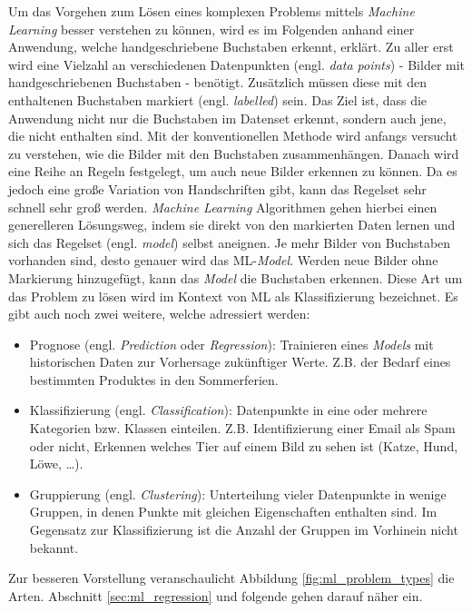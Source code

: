Um das Vorgehen zum Lösen eines komplexen Problems mittels \textit{Machine Learning} besser verstehen zu können, wird es im Folgenden anhand einer Anwendung, welche handgeschriebene Buchstaben erkennt, erklärt. Zu aller erst wird eine Vielzahl an verschiedenen Datenpunkten (engl. \textit{data points}) - Bilder mit handgeschriebenen Buchstaben - benötigt. Zusätzlich müssen diese mit den enthaltenen Buchstaben markiert (engl. \textit{labelled}) sein. Das Ziel ist, dass die Anwendung nicht nur die Buchstaben im Datenset erkennt, sondern auch jene, die nicht enthalten sind. Mit der konventionellen Methode wird anfangs versucht zu verstehen, wie die Bilder mit den Buchstaben zusammenhängen. Danach wird eine Reihe an Regeln festgelegt, um auch neue Bilder erkennen zu können. Da es jedoch eine große Variation von Handschriften gibt, kann das Regelset sehr schnell sehr groß werden. \textit{Machine Learning} Algorithmen gehen hierbei einen generelleren Lösungsweg, indem sie direkt von den markierten Daten lernen und sich das Regelset (engl. \textit{model}) selbst aneignen. Je mehr Bilder von Buchstaben vorhanden sind, desto genauer wird das ML-\textit{Model}. Werden neue Bilder ohne Markierung hinzugefügt, kann das \textit{Model} die Buchstaben erkennen. Diese Art um das Problem zu lösen wird im Kontext von ML als Klassifizierung bezeichnet. Es gibt auch noch zwei weitere, welche adressiert werden:
\begin{itemize}
  \item Prognose (engl. \textit{Prediction} oder \textit{Regression}): Trainieren eines \textit{Models} mit historischen Daten zur Vorhersage zukünftiger Werte. Z.B. der Bedarf eines bestimmten Produktes in den Sommerferien.
  \item Klassifizierung (engl. \textit{Classification}): Datenpunkte in eine oder mehrere Kategorien bzw. Klassen einteilen. Z.B. Identifizierung einer Email als Spam oder nicht, Erkennen welches Tier auf einem Bild zu sehen ist (Katze, Hund, Löwe, \dots).
  \item Gruppierung (engl. \textit{Clustering}): Unterteilung vieler Datenpunkte in wenige Gruppen, in denen Punkte mit gleichen Eigenschaften enthalten sind. Im Gegensatz zur Klassifizierung ist die Anzahl der Gruppen im Vorhinein nicht bekannt.
\end{itemize}

Zur besseren Vorstellung veranschaulicht Abbildung \ref{fig:ml_problem_types} die Arten. Abschnitt \ref{sec:ml_regression} und folgende gehen darauf näher ein.

